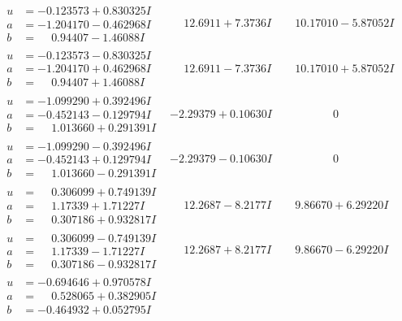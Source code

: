 \documentclass[1p]{elsarticle_modified}
\theoremstyle{definition}
\begin{document}
$$\begin{array}{c|c|c}
\begin{aligned}
u &= -0.123573 + 0.830325 I \\
a &= -1.204170 - 0.462968 I \\
b &= \phantom{-}0.94407 - 1.46088 I\end{aligned}
 & \phantom{-}12.6911 + 7.3736 I & \phantom{-}10.17010 - 5.87052 I \\ \hline\begin{aligned}
u &= -0.123573 - 0.830325 I \\
a &= -1.204170 + 0.462968 I \\
b &= \phantom{-}0.94407 + 1.46088 I\end{aligned}
 & \phantom{-}12.6911 - 7.3736 I & \phantom{-}10.17010 + 5.87052 I \\ \hline\begin{aligned}
u &= -1.099290 + 0.392496 I \\
a &= -0.452143 - 0.129794 I \\
b &= \phantom{-}1.013660 + 0.291391 I\end{aligned}
 & -2.29379 + 0.10630 I & \phantom{-0.000000 } 0 \\ \hline\begin{aligned}
u &= -1.099290 - 0.392496 I \\
a &= -0.452143 + 0.129794 I \\
b &= \phantom{-}1.013660 - 0.291391 I\end{aligned}
 & -2.29379 - 0.10630 I & \phantom{-0.000000 } 0 \\ \hline\begin{aligned}
u &= \phantom{-}0.306099 + 0.749139 I \\
a &= \phantom{-}1.17339 + 1.71227 I \\
b &= \phantom{-}0.307186 + 0.932817 I\end{aligned}
 & \phantom{-}12.2687 - 8.2177 I & \phantom{-}9.86670 + 6.29220 I \\ \hline\begin{aligned}
u &= \phantom{-}0.306099 - 0.749139 I \\
a &= \phantom{-}1.17339 - 1.71227 I \\
b &= \phantom{-}0.307186 - 0.932817 I\end{aligned}
 & \phantom{-}12.2687 + 8.2177 I & \phantom{-}9.86670 - 6.29220 I \\ \hline\begin{aligned}
u &= -0.694646 + 0.970578 I \\
a &= \phantom{-}0.528065 + 0.382905 I \\
b &= -0.464932 + 0.052795 I\end{aligned}

\end{array}$$
\end{document}
